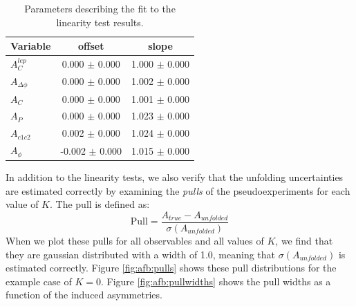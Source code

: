 \begin{table}[htpb]
\begin{center}
\caption{Parameters describing the fit to the linearity test results.}
\label{tab:afb:linearity}
\begin{tabular}{l |  c  c }
\hline
Variable &  offset  &  slope \\ \hline
$A^{lep}_{C}$       &   0.000 $\pm$ 0.000  &  1.000 $\pm$ 0.000\\ \hline
$A_{\Delta\phi}$ &   0.000 $\pm$ 0.000  &  1.002 $\pm$ 0.000\\ \hline
$A_{C}$          &   0.000 $\pm$ 0.000  &  1.001 $\pm$ 0.000\\ \hline
$A_{P}$          &   0.000 $\pm$ 0.000  &  1.023 $\pm$ 0.000\\ \hline
$A_{c1c2}$       &   0.002 $\pm$ 0.000  &  1.024 $\pm$ 0.000\\ \hline
$A_{\phi}$       &   -0.002 $\pm$ 0.000  &  1.015 $\pm$ 0.000\\ \hline
 \hline
\end{tabular}
\end{center}
\end{table}

In addition to the linearity tests, we also verify that the unfolding
uncertainties are estimated correctly by examining the \emph{pulls} of
the pseudoexperiments for each value of $K$. The pull is defined as:
\begin{equation}
\text{Pull} = \frac{A_{true} - A_{unfolded}}{\sigma(A_{unfolded})}
\end{equation}
When we plot these pulls for all observables and all values of $K$, we
find that they are gaussian distributed with a width of 1.0, meaning
that $\sigma(A_{unfolded})$ is estimated
correctly. Figure \ref{fig:afb:pulls} shows these pull
distributions for the example case of $K = 0$. Figure
\ref{fig:afb:pullwidths} shows the pull widths as a function of the
induced asymmetries.

